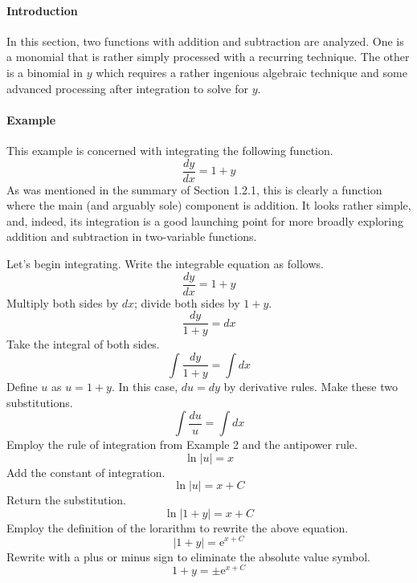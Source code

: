 \documentclass{article}
\newcounter{example}%
\newcommand{\ex}{\stepcounter{example} \paragraph{Example \theexample}}
\begin{document}
\paragraph{Introduction} In this section, two functions with addition and subtraction are analyzed. One is a monomial that is rather simply processed with a recurring technique. The other is a binomial in $y$ which requires a rather ingenious algebraic technique and some advanced processing after integration to solve for $y$.
\ex This example is concerned with integrating the following function.$$\frac{dy}{dx}=1+y$$
As was mentioned in the summary of Section 1.2.1, this is clearly a function where the main (and arguably sole) component is addition. It looks rather simple, and, indeed, its integration is a good launching point for more broadly exploring addition and subtraction in two-variable functions.\par
Let's begin integrating. Write the integrable equation as follows.
\begin{equation*}
    \frac{dy}{dx}=1+y
\end{equation*}
Multiply both sides by $dx$; divide both sides by $1+y$.
\begin{equation*}
    \frac{dy}{1+y}=dx
\end{equation*}
Take the integral of both sides.
\begin{equation*}
    \int\frac{dy}{1+y}=\int dx
\end{equation*}
Define $u$ as $u=1+y$. In this case, $du=dy$ by derivative rules. Make these two substitutions.
\begin{equation*}
    \int\frac{du}{u}=\int dx
\end{equation*}
Employ the rule of integration from Example 2 and the antipower rule.
\begin{equation*}
    \ln|u|=x
\end{equation*}
Add the constant of integration.
\begin{equation*}
    \ln|u|=x+C
\end{equation*}
Return the substitution.
\begin{equation*}
    \ln|1+y|=x+C
\end{equation*}
Employ the definition of the lorarithm to rewrite the above equation.
\begin{equation*}
    |1+y|=\text{e}^{x+C}
\end{equation*}
Rewrite with a plus or minus sign to eliminate the absolute value symbol.
\begin{equation*}
    1+y=\pm\text{e}^{x+C}
\end{equation*}
\end{document}
